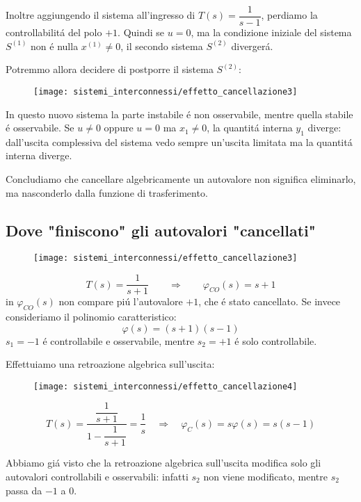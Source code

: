 \documentclass[../main.tex]{subfiles}
\begin{document}
		Inoltre aggiungendo il sistema all'ingresso di $ T(s)=\dfrac{1}{s-1} $, perdiamo la controllabilit\'a del polo $ +1 $. Quindi se $ u = 0 $, ma la condizione iniziale del sistema $ S^{(1)} $ non \'e nulla $ x^{(1)} \neq 0 $, il secondo sistema $ S^{(2)} $ diverger\'a.
		
		Potremmo allora decidere di postporre il sistema $ S^{(2)} $:
		\begin{figure}[H]
			\centering\texttt{[image: sistemi\_interconnessi/effetto\_cancellazione3]}
			\label{fig:effetto_cancellazione3}
		\end{figure}
	
		In questo nuovo sistema la parte instabile \'e non osservabile, mentre quella stabile \'e osservabile. Se $ u \neq 0 $ oppure $ u = 0 $ ma $ x_1 \neq 0 $, la quantit\'a interna $ y_1 $ diverge: dall'uscita complessiva del sistema vedo sempre un'uscita limitata ma la quantit\'a interna diverge.
		
		Concludiamo che cancellare algebricamente un autovalore non significa eliminarlo, ma nasconderlo dalla funzione di trasferimento.
		
	\subsection{Dove "finiscono" gli autovalori "cancellati"}
		\begin{figure}[H]
			\centering\texttt{[image: sistemi\_interconnessi/effetto\_cancellazione3]}
		\end{figure}
		\[
			T(s) = \dfrac{1}{s+1}
			\qquad\Rightarrow\qquad
			\varphi_{CO}(s)=s+1
		\]
		in $ \varphi_{CO}(s) $ non compare pi\'u l'autovalore $ +1 $, che \'e stato cancellato. Se invece consideriamo il polinomio caratteristico:
		\[
			\varphi(s)=(s+1)(s-1)
		\]
		$ s_1 = -1 $ \'e controllabile e osservabile, mentre $ s_2 = +1 $ \'e solo controllabile.
		
		Effettuiamo una retroazione algebrica sull'uscita:
		\begin{figure}[H]
			\centering\texttt{[image: sistemi\_interconnessi/effetto\_cancellazione4]}
		\end{figure}
		
		\[
			T(s)=\dfrac{\dfrac{1}{s+1}}{1-\dfrac{1}{s+1}} = \dfrac{1}{s} \quad\Rightarrow\quad \varphi_C(s)=s \varphi(s)=s(s-1)
		\]
		
		Abbiamo gi\'a visto che la retroazione algebrica sull'uscita modifica solo gli autovalori controllabili e osservabili: infatti $ s_2 $ non viene modificato, mentre $ s_2 $ passa da $ -1 $ a $ 0 $.
		
		\begin{center}
		\end{center}
		
\end{document}
